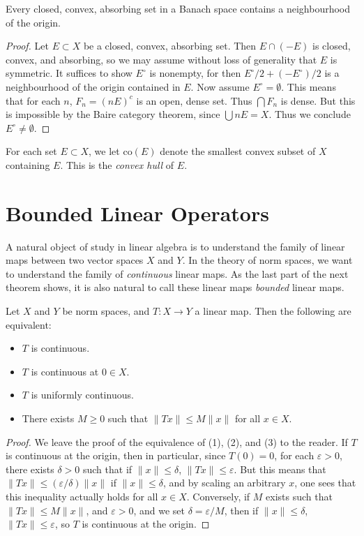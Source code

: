 \begin{theorem}
    Every closed, convex, absorbing set in a Banach space contains a neighbourhood of the origin.
\end{theorem}
\begin{proof}
    Let $E \subset X$ be a closed, convex, absorbing set. Then $E \cap (-E)$ is closed, convex, and absorbing, so we may assume without loss of generality that $E$ is symmetric. It suffices to show $E^\circ$ is nonempty, for then $E^\circ/2 + (-E^\circ)/2$ is a neighbourhood of the origin contained in $E$. Now assume $E^\circ = \emptyset$. This means that for each $n$, $F_n = (nE)^c$ is an open, dense set. Thus $\bigcap F_n$ is dense. But this is impossible by the Baire category theorem, since $\bigcup nE = X$. Thus we conclude $E^\circ \neq \emptyset$.
\end{proof}

For each set $E \subset X$, we let $\text{co}(E)$ denote the smallest convex subset of $X$ containing $E$. This is the {\it convex hull} of $E$.

\section{Bounded Linear Operators}

A natural object of study in linear algebra is to understand the family of linear maps between two vector spaces $X$ and $Y$. In the theory of norm spaces, we want to understand the family of {\it continuous} linear maps. As the last part of the next theorem shows, it is also natural to call these linear maps \emph{bounded} linear maps.

\begin{theorem}
    Let $X$ and $Y$ be norm spaces, and $T: X \to Y$ a linear map. Then the following are equivalent:
    \begin{itemize}
        \item $T$ is continuous.
        \item $T$ is continuous at $0 \in X$.
        \item $T$ is uniformly continuous.
        \item There exists $M \geq 0$ such that $\| Tx \| \leq M \| x \|$ for all $x \in X$.
    \end{itemize}
\end{theorem}
\begin{proof}
    We leave the proof of the equivalence of (1), (2), and (3) to the reader. If $T$ is continuous at the origin, then in particular, since $T(0) = 0$, for each $\varepsilon > 0$, there exists $\delta > 0$ such that if $\| x \| \leq \delta$, $\| Tx \| \leq \varepsilon$. But this means that $\| Tx \| \leq (\varepsilon / \delta) \| x \|$ if $\| x \| \leq \delta$, and by scaling an arbitrary $x$, one sees that this inequality actually holds for all $x \in X$. Conversely, if $M$ exists such that $\| Tx \| \leq M \| x \|$, and $\varepsilon > 0$, and we set $\delta = \varepsilon / M$, then if $\| x \| \leq \delta$, $\| Tx \| \leq \varepsilon$, so $T$ is continuous at the origin.
\end{proof}

